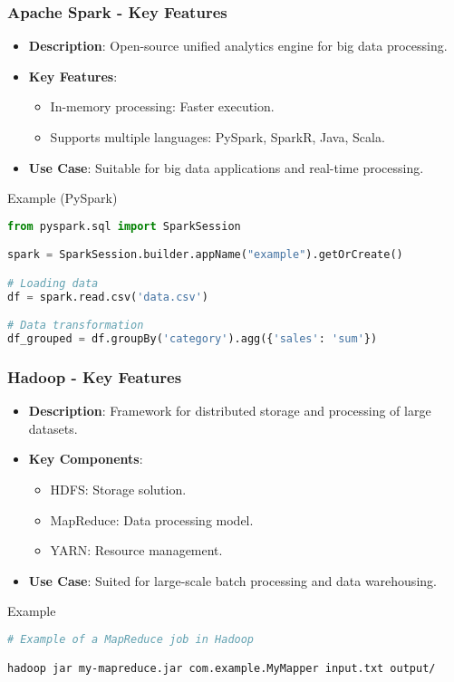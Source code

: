 \documentclass[aspectratio=169]{beamer}
\begin{document}
\begin{frame}[fragile]
    \frametitle{Apache Spark - Key Features}
    \begin{itemize}
        \item \textbf{Description}: Open-source unified analytics engine for big data processing.
        \item \textbf{Key Features}:
        \begin{itemize}
            \item In-memory processing: Faster execution.
            \item Supports multiple languages: PySpark, SparkR, Java, Scala.
        \end{itemize}
        \item \textbf{Use Case}: Suitable for big data applications and real-time processing.
    \end{itemize}
    \begin{block}{Example (PySpark)}
        \begin{lstlisting}[language=Python]
from pyspark.sql import SparkSession

spark = SparkSession.builder.appName("example").getOrCreate()

# Loading data
df = spark.read.csv('data.csv')

# Data transformation
df_grouped = df.groupBy('category').agg({'sales': 'sum'})
        \end{lstlisting}
    \end{block}
\end{frame}

\begin{frame}[fragile]
    \frametitle{Hadoop - Key Features}
    \begin{itemize}
        \item \textbf{Description}: Framework for distributed storage and processing of large datasets.
        \item \textbf{Key Components}:
        \begin{itemize}
            \item HDFS: Storage solution.
            \item MapReduce: Data processing model.
            \item YARN: Resource management.
        \end{itemize}
        \item \textbf{Use Case}: Suited for large-scale batch processing and data warehousing.
    \end{itemize}
    \begin{block}{Example}
        \begin{lstlisting}[language=bash]
# Example of a MapReduce job in Hadoop

hadoop jar my-mapreduce.jar com.example.MyMapper input.txt output/
        \end{lstlisting}
    \end{block}
\end{frame}
\end{document}
